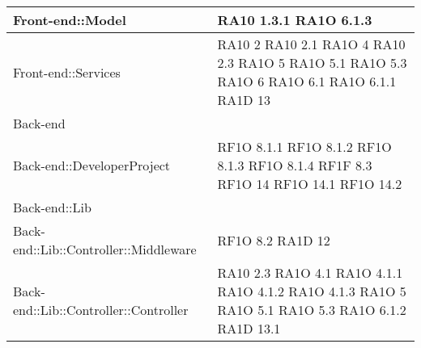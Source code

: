 \begin{center}
\begin{longtable}{|p{7cm}|p{3cm}|}
		Front-end::Model & RA10 1.3.1 \newline RA1O 6.1.3 \\ \hline
		
		Front-end::Services & RA10 2 \newline RA10 2.1 \newline RA1O 4 \newline RA10 2.3 \newline RA1O 5 \newline RA1O 5.1 \newline RA1O 5.3 \newline	RA1O 6 \newline 
		RA1O 6.1 \newline RA1O 6.1.1 \newline RA1D 13 \newline
		\\ \hline
	
	Back-end & \\ \hline
	
		Back-end::DeveloperProject & RF1O 8.1.1 \newline RF1O 8.1.2 \newline RF1O 8.1.3 RF1O 8.1.4 \newline RF1F 8.3 \newline RF1O 14 \newline
		RF1O 14.1 \newline RF1O 14.2 \newline 
		 \\ \hline
		
		Back-end::Lib & \\ \hline
		
			Back-end::Lib::Controller::Middleware & RF1O 8.2 \newline RA1D 12 \newline 			\\ \hline
			Back-end::Lib::Controller::Controller & RA10 2.3 \newline RA1O 4.1 \newline RA1O 4.1.1 \newline RA1O 4.1.2 \newline  RA1O 4.1.3 \newline RA1O 5 \newline RA1O 5.1 \newline RA1O 5.3 \newline RA1O 6.1.2 \newline  RA1D 13.1
			 	\\ \hline
			

\end{longtable}
\end{center}
